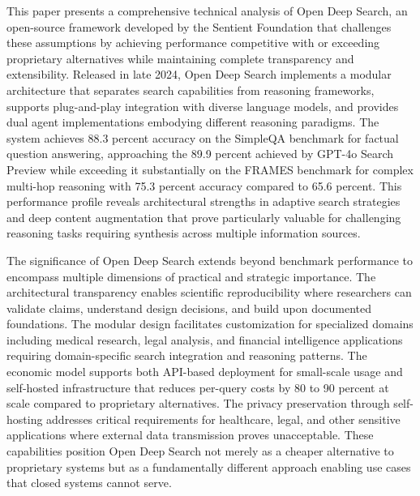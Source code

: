 This paper presents a comprehensive technical analysis of Open Deep Search, an open-source framework developed by the Sentient Foundation that challenges these assumptions by achieving performance competitive with or exceeding proprietary alternatives while maintaining complete transparency and extensibility. Released in late 2024, Open Deep Search implements a modular architecture that separates search capabilities from reasoning frameworks, supports plug-and-play integration with diverse language models, and provides dual agent implementations embodying different reasoning paradigms. The system achieves 88.3 percent accuracy on the SimpleQA benchmark for factual question answering, approaching the 89.9 percent achieved by GPT-4o Search Preview while exceeding it substantially on the FRAMES benchmark for complex multi-hop reasoning with 75.3 percent accuracy compared to 65.6 percent. This performance profile reveals architectural strengths in adaptive search strategies and deep content augmentation that prove particularly valuable for challenging reasoning tasks requiring synthesis across multiple information sources.

The significance of Open Deep Search extends beyond benchmark performance to encompass multiple dimensions of practical and strategic importance. The architectural transparency enables scientific reproducibility where researchers can validate claims, understand design decisions, and build upon documented foundations. The modular design facilitates customization for specialized domains including medical research, legal analysis, and financial intelligence applications requiring domain-specific search integration and reasoning patterns. The economic model supports both API-based deployment for small-scale usage and self-hosted infrastructure that reduces per-query costs by 80 to 90 percent at scale compared to proprietary alternatives. The privacy preservation through self-hosting addresses critical requirements for healthcare, legal, and other sensitive applications where external data transmission proves unacceptable. These capabilities position Open Deep Search not merely as a cheaper alternative to proprietary systems but as a fundamentally different approach enabling use cases that closed systems cannot serve.


